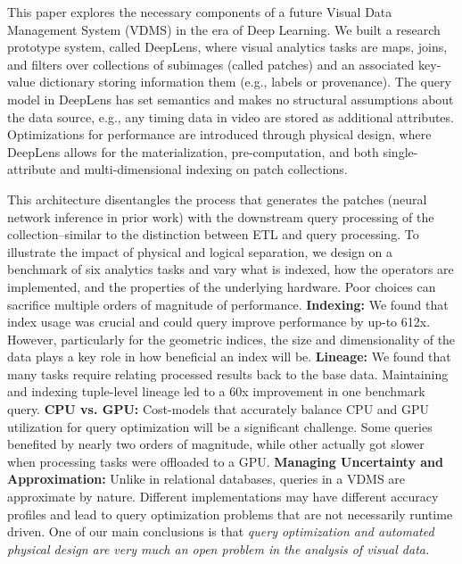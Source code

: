 This paper explores the necessary components of a future Visual Data Management System (VDMS) in the era of Deep Learning.
We built a research prototype system, called \textsf{DeepLens}, where visual analytics tasks are maps, joins, and filters over collections of subimages (called patches) and an associated key-value dictionary storing information them (e.g., labels or provenance). The query model in \textsf{DeepLens} has set semantics and makes no structural assumptions about the data source, e.g., any timing data in video are stored as additional attributes. Optimizations for performance are introduced through physical design, where \textsf{DeepLens} allows for the materialization, pre-computation, and both single-attribute and multi-dimensional indexing on patch collections.


This architecture disentangles the process that generates the patches (neural network inference in prior work) with the downstream query processing of the collection--similar to the distinction between ETL and query processing.
To illustrate the impact of physical and logical separation, we 
 design on a benchmark of six analytics tasks and vary what is indexed, how the operators are implemented, and the properties of the underlying hardware.
 Poor choices can sacrifice multiple orders of magnitude of performance.
\textbf{Indexing: } We found that index usage was crucial and could query improve performance by up-to 612x. However, particularly for the geometric indices, the size and dimensionality of the data plays a key role in how beneficial an index will be.
\textbf{Lineage: }We found that many tasks require relating processed results back to the base data.
Maintaining and indexing tuple-level lineage led to a 60x improvement in one benchmark query.
\textbf{CPU vs. GPU: }Cost-models that accurately balance CPU and GPU utilization for query optimization will be a significant challenge. Some queries benefited by nearly two orders of magnitude, while other actually got slower when processing tasks were offloaded to a GPU.
\textbf{Managing Uncertainty and Approximation: }Unlike in relational databases, queries in a VDMS are approximate by nature. Different implementations may have different accuracy profiles and lead to query optimization problems that are not necessarily runtime driven.
One of our main conclusions is that \emph{query optimization and automated physical design are very much an open problem in the analysis of visual data.}


